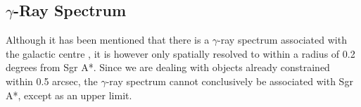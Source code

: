\subsection{$\gamma$-Ray Spectrum}
Although it has been mentioned that there is a $\gamma$-ray spectrum associated with the galactic centre \cite{ref_gamma}, it is however
only spatially resolved to within a radius of 0.2 degrees from Sgr A*. Since we are dealing with objects already constrained within 0.5
arcsec, the $\gamma$-ray spectrum cannot conclusively be associated with Sgr A*, except as an upper limit.
